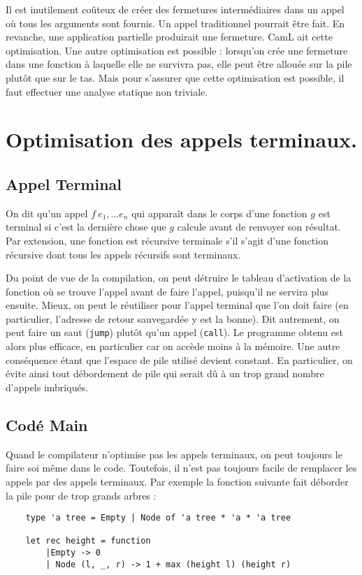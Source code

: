 \documentclass{cours}
\begin{document}
Il est inutilement coûteux de créer des fermetures intermédiaires dans un appel où tous les arguments sont fournis. Un appel traditionnel pourrait être fait. En revanche, une application partielle produirait une fermeture. CamL ait cette optimisation.
Une autre optimisation est possible : lorsqu'on crée une fermeture dans une fonction à laquelle elle ne survivra pas, elle peut être allouée sur la pile plutôt que sur le tas. Mais pour s'assurer que cette optimisation est possible, il faut effectuer une analyse statique non triviale.

\section{Optimisation des appels terminaux.}
\subsection{Appel Terminal}
\begin{definition}
    On dit qu'un appel $f\ e_{1}, \ldots e_{n}$ qui apparaît dans le corps d'une fonction $g$ est terminal si c'est la dernière chose que $g$ calcule avant de renvoyer son résultat. Par extension, une fonction est récursive terminale s'il s'agit d'une fonction récursive dont tous les appels récursifs sont terminaux.
\end{definition}

Du point de vue de la compilation, on peut détruire le tableau d'activation de la fonction où se trouve l'appel avant de faire l'appel, puisqu'il ne servira plus ensuite. Mieux, on peut le réutiliser pour l'appel terminal que l'on doit faire (en particulier, l'adresse de retour sauvegardée y est la bonne). Dit autrement, on peut faire un saut (\texttt{jump}) plutôt qu'un appel (\texttt{call}).
Le programme obtenu est alors plus efficace, en particulier car on accède moins à la mémoire. Une autre conséquence étant que l'espace de pile utilisé devient constant. En particulier, on évite ainsi tout débordement de pile qui serait dû à un trop grand nombre d'appels imbriqués.

\subsection{Codé Main}
Quand le compilateur n'optimise pas les appels terminaux, on peut toujours le faire soi même dans le code. Toutefois, il n'est pas toujours facile de remplacer les appels par des appels terminaux.
Par exemple la fonction suivante fait déborder la pile pour de trop grands arbres :
\begin{verbatim}
    type 'a tree = Empty | Node of 'a tree * 'a * 'a tree

    let rec height = function
        |Empty -> 0
        | Node (l, _, r) -> 1 + max (height l) (height r)
\end{verbatim}
\end{document}
